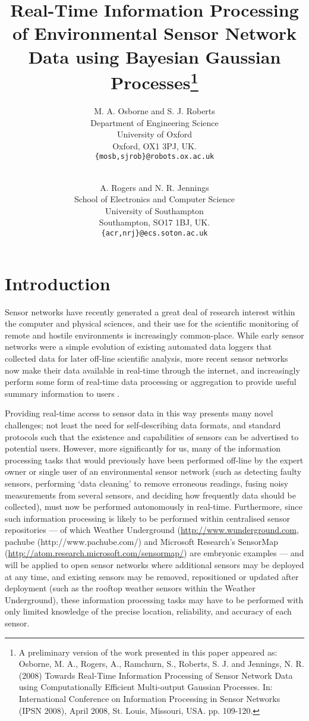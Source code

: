 \documentclass{acmtrans2m}
\title{Real-Time Information Processing of Environmental Sensor Network Data using Bayesian Gaussian Processes\footnote{A preliminary version of the work presented in this paper appeared as: Osborne, M. A., Rogers, A., Ramchurn, S., Roberts, S. J. and Jennings, N. R. (2008) Towards Real-Time Information Processing of Sensor Network Data using Computationally Efficient Multi-output Gaussian Processes. In: International Conference on Information Processing in Sensor Networks (IPSN 2008), April 2008, St. Louis, Missouri, USA. pp. 109-120.}}
\author{M. A. Osborne and S. J. Roberts\\
Department of Engineering Science\\
University of Oxford\\
Oxford, OX1 3PJ, UK.\\
{\tt{\{mosb,sjrob\}@robots.ox.ac.uk}}\\
\and\\
A. Rogers and N. R. Jennings\\
School of Electronics and Computer Science\\
University of Southampton\\
Southampton, SO17 1BJ, UK.\\
{\tt{\{acr,nrj\}@ecs.soton.ac.uk}}\\
}
\begin{document}
\maketitle

\section{Introduction}

\noindent Sensor networks have recently generated a great deal of research interest within the computer and physical sciences, and their use for the scientific monitoring of remote and hostile environments is increasingly common-place. While early sensor networks were a simple evolution of existing automated data loggers that collected data for later off-line scientific analysis, more recent sensor networks now make their data available in real-time through the internet, and increasingly perform some form of real-time data processing or aggregation to provide useful summary information to users \cite{esn}.

Providing real-time access to sensor data in this way presents many novel challenges; not least the need for self-describing data formats, and standard protocols such that the existence and capabilities of sensors can be advertised to potential users. However, more significantly for us, many of the information processing tasks that would previously have been performed off-line by the expert owner or single user of an environmental sensor network (such as detecting faulty sensors, performing `data cleaning' to remove erroneous readings, fusing noisy measurements from several sensors, and deciding how frequently data should be collected), must now be performed autonomously in real-time. Furthermore, since such information processing is likely to be performed within centralised sensor repositories --- of which Weather Underground (\url{http://www.wunderground.com}, pachube (http://www.pachube.com/) and Microsoft Research's SensorMap (\url{http://atom.research.microsoft.com/sensormap/}) are embryonic examples --- and will be applied to open sensor networks where additional sensors may be deployed at any time, and existing sensors may be removed, repositioned or updated after deployment (such as the rooftop weather sensors within the Weather Underground), these information processing tasks may have to be performed with only limited knowledge of the precise location, reliability, and accuracy of each sensor.
\end{document}
